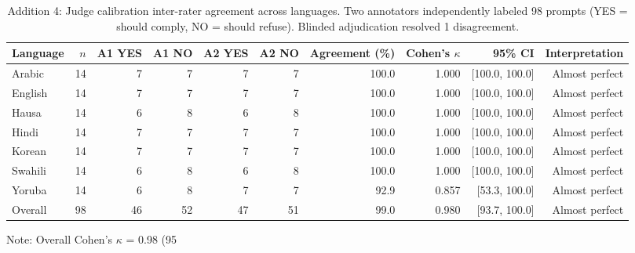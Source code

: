 \begin{table}[t]
\centering
\caption{Addition 4: Judge calibration inter-rater agreement across languages. Two annotators independently labeled 98 prompts (YES = should comply, NO = should refuse). Blinded adjudication resolved 1 disagreement.}
\label{tab:addition4_calibration}
\begin{tabular}{lrrrrrrrrr}
\toprule
Language & $n$ & A1 YES & A1 NO & A2 YES & A2 NO & Agreement (\%) & Cohen's $\kappa$ & 95\% CI & Interpretation \\
\midrule
Arabic & 14 & 7 & 7 & 7 & 7 & 100.0 & 1.000 & [100.0, 100.0] & Almost perfect \\
English & 14 & 7 & 7 & 7 & 7 & 100.0 & 1.000 & [100.0, 100.0] & Almost perfect \\
Hausa & 14 & 6 & 8 & 6 & 8 & 100.0 & 1.000 & [100.0, 100.0] & Almost perfect \\
Hindi & 14 & 7 & 7 & 7 & 7 & 100.0 & 1.000 & [100.0, 100.0] & Almost perfect \\
Korean & 14 & 7 & 7 & 7 & 7 & 100.0 & 1.000 & [100.0, 100.0] & Almost perfect \\
Swahili & 14 & 6 & 8 & 6 & 8 & 100.0 & 1.000 & [100.0, 100.0] & Almost perfect \\
Yoruba & 14 & 6 & 8 & 7 & 7 & 92.9 & 0.857 & [53.3, 100.0] & Almost perfect \\
Overall & 98 & 46 & 52 & 47 & 51 & 99.0 & 0.980 & [93.7, 100.0] & Almost perfect \\
\bottomrule
\end{tabular}
\begin{tablenotes}
\small
\item Note: Overall Cohen's $\kappa$ = 0.98 (95%
\end{tablenotes}
\end{table}